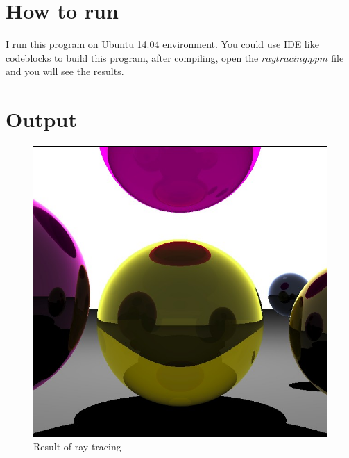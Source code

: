 \documentclass{article}
\begin{document}
\section{How to run}
I run this program on Ubuntu 14.04 environment.
You could use IDE like codeblocks to build this program, after compiling, open the $raytracing.ppm$ file and you will see the results.

\section{Output}
\begin{figure}[htbp]
	\centering
	\includegraphics[width=12cm]{raytracing.jpg}
\caption{Result of ray tracing}

\end{figure}
\end{document}
